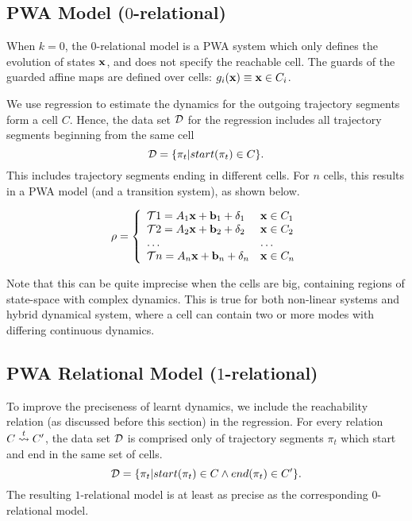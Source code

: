 \subsection{PWA Model ($0$-relational)}
When $k=0$, the $0$-relational model is a PWA system which only
defines the evolution of states $\mathbf{x}$, and does not specify the
reachable cell. The guards of the guarded affine maps are defined over
cells: $g_i(\mathbf{x}) \equiv \mathbf{x} \in C_i$.

We use regression to estimate the dynamics for the outgoing trajectory
segments form a cell $C$. Hence, the data set $\mathcal{D}$ for the regression
includes all trajectory segments beginning from the same cell
\[
    \mathcal{D} = \{\pi_t | start(\pi_t) \in C\}.
\]
This includes trajectory segments ending in different cells.  For $n$
cells, this results in a PWA model (and a transition system), as
shown below.

\begin{equation}
    \rho = \left\{
        \begin{array}{ll}
            \mathcal{T}{1} = A_1\mathbf{x} + \mathbf{b}_1 + \delta_1 & \mathbf{x} \in C_1\\
            \mathcal{T}{2} = A_2\mathbf{x} + \mathbf{b}_2 + \delta_2 & \mathbf{x} \in C_2\\
            \ldots & \ldots\\
            \mathcal{T}{n} = A_n\mathbf{x} + \mathbf{b}_n + \delta_n & \mathbf{x} \in C_n
        \end{array}
    \right.
\end{equation}

Note that this can be quite imprecise when the cells are big,
containing regions of state-space with complex dynamics. This is true
for both non-linear systems and hybrid dynamical system, where a cell
can contain two or more modes with differing continuous dynamics.

\subsection{PWA Relational Model ($1$-relational)}

To improve the preciseness of learnt dynamics, we include the
reachability relation (as discussed before this section) in the
regression. For every relation $C\overset{t}{\rightsquigarrow}C'$, the data set $\mathcal{D}$ is
comprised only of trajectory segments $\pi_t$ which start and end in
the same set of cells.
\[
    \mathcal{D} = \{\pi_t | start(\pi_t) \in C \land end(\pi_t) \in C'\}.
\]
The resulting $1$-relational model is at least as precise as the
corresponding $0$-relational model.

